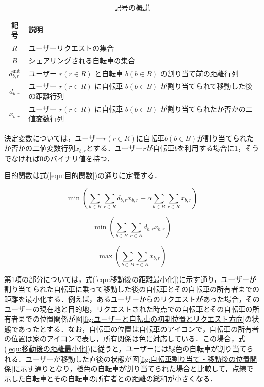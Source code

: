       \begin{table}[htbp]
        \caption{記号の概説}
        \label{tab:記号の概説}
        \centering
        \begin{tabular}{c p{6cm}}
          \hline 
          記号 & 説明 \\
          \hline
          $R$ & ユーザーリクエストの集合 \\
          $B$ & シェアリングされる自転車の集合 \\
          $d^{\text{init}}_{b,r}$ & ユーザー $r(r \in R)$ と自転車 $b(b \in B)$ の割り当て前の距離行列\\
          $d_{b,r}$ & ユーザー $r (r \in R)$ に自転車 $b (b \in B)$ が割り当てられて移動した後の距離行列 \\
          $x_{b,r}$ & ユーザー $r (r \in R)$ に自転車 $b (b \in B)$ が割り当てられたか否かの二値変数行列 \\
          \hline
        \end{tabular}
      \end{table}
      
      \par 決定変数については，ユーザー$r (r \in R)$に自転車$b (b \in B)$が割り当てられたか否かの二値変数行列$x_{b,r}$とする．ユーザー$r$が自転車$b$を利用する場合に1，そうでなければ0のバイナリ値を持つ．
      
      \par 目的関数は式(\ref{equ:目的関数})の通りに定義する．
      
      \begin{equation}\label{equ:目的関数}
        \min \left( \sum_{b \in B}\sum_{r \in R}d_{b,r}x_{b,r} - \alpha\sum_{b \in B}\sum_{r \in R}x_{b,r} \right)
      \end{equation}
      
      \begin{equation}\label{equ:移動後の距離最小化}
        \min \left( \sum_{b \in B}\sum_{r \in R}d_{b,r}x_{b,r} \right)
      \end{equation}
      
      \begin{equation}\label{equ:割り当て成功率最大化}
        \max \left(\sum_{b \in B}\sum_{r \in R}x_{b,r} \right)
      \end{equation}
      
      \par 第1項の部分については，式(\ref{equ:移動後の距離最小化})に示す通り，ユーザーが割り当てられた自転車に乗って移動した後の自転車とその自転車の所有者までの距離を最小化する．例えば，あるユーザーからのリクエストがあった場合，そのユーザーの現在地と目的地，リクエストされた時点での自転車とその自転車の所有者までの位置関係が図\ref{fig:ユーザーと自転車の初期位置とリクエスト方向}の状態であったとする．なお，自転車の位置は自転車のアイコンで，自転車の所有者の位置は家のアイコンで表し，所有関係は色に対応している．この場合，式(\ref{equ:移動後の距離最小化})に従うと，ユーザーには緑色の自転車が割り当てられる．ユーザーが移動した直後の状態が図\ref{fig:自転車割り当て・移動後の位置関係}に示す通りとなり，橙色の自転車が割り当てられた場合と比較して，点線で示した自転車とその自転車の所有者との距離の総和が小さくなる．
      
